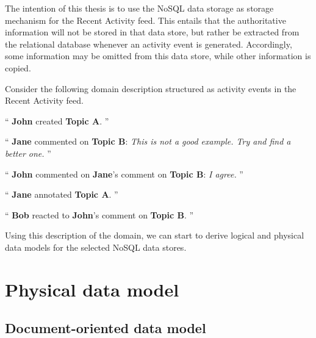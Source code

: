 The intention of this thesis is to use the NoSQL data storage as storage mechanism for the Recent Activity feed.
This entails that the authoritative information will not be stored in that data store, but rather be extracted from the relational database whenever an activity event is generated.
Accordingly, some information may be omitted from this data store, while other information is copied.

Consider the following domain description structured as activity events in the Recent Activity feed.

``
\textbf{John} created \textbf{Topic A}.
''

``
\textbf{Jane} commented on \textbf{Topic B}:
\textit{This is not a good example. Try and find a better one.}
''

``
\textbf{John} commented on \textbf{Jane}'s comment on \textbf{Topic B}:
\textit{I agree.}
''

``
\textbf{Jane} annotated \textbf{Topic A}.
''

``
\textbf{Bob} reacted to \textbf{John}'s comment on \textbf{Topic B}.
''

Using this description of the domain, we can start to derive logical and physical data models for the selected NoSQL data stores.


\section{Physical data model}
\label{sec:physical-data-model}

\subsection{Document-oriented data model}
\label{subsec:document-data-model}


